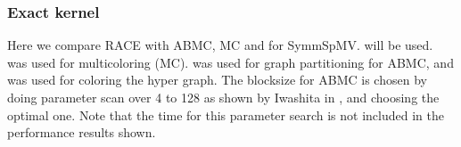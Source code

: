 

\subsubsection{Exact kernel}
Here we compare  \acrshort{RACE} with \acrshort{ABMC}, \acrshort{MC} and \MKL for \acrshort{SymmSpMV}.  will be used. \COLPACK \cite{COLPACK} %
was used for multicoloring (\acrshort{MC}). \METIS \cite{METIS}  was used for graph partitioning for \acrshort{ABMC}, and \COLPACK was used for coloring the hyper graph. The blocksize for \acrshort{ABMC} is chosen by doing parameter scan over 4 to 128 as shown by Iwashita \etal in \cite{ABMC}, and choosing the optimal one. Note that the time for this parameter search is not included in the performance results shown. 


